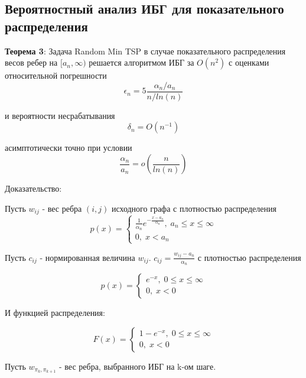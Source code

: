 \documentclass[a4paper, 14pt]{extarticle}
\numberwithin{equation}{section}
\begin{document}
\subsection{Вероятностный анализ ИБГ для показательного распределения}


\textbf{Теорема 3}: Задача Random Min TSP в случае показательного распределения весов ребер на $[a_n,\infty)$ решается алгоритмом ИБГ за $O(n^2)$ с оценками относительной погрешности
\begin{equation}
\epsilon_n = 5 \frac{\alpha_n/a_n}{n/ln(n)}
\end{equation}

и вероятности несрабатывания
\begin{equation}
\delta_n = O(n^{-1})
\end{equation}

асимптотически точно при условии
\begin{equation}
\frac{\alpha_n}{a_n} = o(\frac{n}{ln(n)})
\end{equation}

Доказательство:

Пусть $w_{ij}$ - вес ребра $(i, j)$ исходного графа с плотностью распределения
\begin{equation}
p(x) = \begin{cases}
\frac{1}{\alpha_n} e^{-\frac{x-a_n}{\alpha_n}}, \; a_n \leq x \leq \infty \\
0, \; x < a_n
\end{cases}
\end{equation}

Пусть $c_{ij}$ - нормированная величина $w_{ij}$. $c_{ij} = \frac{w_{ij}-a_n}{\alpha_n}$  с плотностью распределения

\begin{equation}
p(x) = \begin{cases}
 e^{-x}, \; 0 \leq x \leq \infty \\
0, \; x < 0
\end{cases}
\end{equation}

И функцией распределения:

\begin{equation}
F(x) = \begin{cases}
 1-e^{-x}, \; 0 \leq x \leq \infty \\
0, \; x < 0
\end{cases}
\end{equation}

Пусть $w_{\pi_k, \pi_{k+1}}$ - вес ребра, выбранного ИБГ на k-ом шаге.
\end{document}
